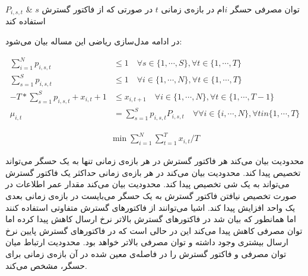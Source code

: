 $P_{i, s, t}$ & توان مصرفی حسگر $i$ام در بازه‌ی زمانی $t$ در صورتی که از فاکتور گسترش $s$ استفاده کند \\



در ادامه مدل‌سازی ریاضی این مساله بیان می‌شود:

\begin{align}
  \sum_{i = 1}^{N} p_{i, s, t} &\le 1 \quad \forall s \in \{1, \cdots, S\}, \forall t \in \{1, \cdots, T\} \label{eq:constr_subchannel_limit} \\
  \sum_{s = 1}^{S} p_{i, s, t} &\le 1 \quad \forall i \in \{1, \cdots, N\}, \forall t \in \{1, \cdots, T\} \label{eq:constr_thing_limit} \\
  -T * \sum_{s = 1}^{S} p_{i, s, t} + x_{i, t} + 1 &\le x_{i, t + 1} \quad \forall i \in \{1, \cdots, N\}, \forall t \in \{1, \cdots, T - 1\} \label{eq:constr_aoi_limit} \\
  \mu_{i, t} &= \sum_{s = 1}^{S} p_{i, s, t} P_{i, s, t}  \quad \forall \forall i \in \{i, \cdots, N\}, \forall t in \{1, \cdots, T\} \label{eq:constr_power_range}
\end{align}

\begin{align}
  \min \sum_{i = 1}^{N} \sum_{t = 1}^{T} x_{i, t} / T
\end{align}


محدودیت  بیان می‌کند هر فاکتور گسترش در هر بازه‌ی زمانی تنها به یک حسگر می‌تواند تخصیص پیدا کند.
محدودیت  بیان می‌کند در هر بازه‌ی زمانی حداکثر یک فاکتور گسترش می‌تواند به یک شی تخصیص پیدا کند.
محدودیت  بیان می‌کند مقدار عمر اطلاعات در صورت تخصیص نیافتن فاکتور گسترش به یک حسگر می‌بایست در بازه‌ی زمانی بعدی یک واحد افزایش پیدا کند.
اشیا می‌توانند از فاکتورهای گسترش متفاوتی استفاده کنند اما همانطور که بیان شد در فاکتورهای گسترش بالاتر نرخ ارسال کاهش پیدا کرده اما توان مصرفی کاهش پیدا می‌کند این در حالی است که
در فاکتورهای گسترش پایین نرخ ارسال بیشتری وجود داشته و توان مصرفی بالاتر خواهد بود. محدودیت  ارتباط میان توان مصرفی و فاکتور گسترش را در فاصله‌ی
معین شده در آن بازه‌ی زمانی برای حسگر، مشخص می‌کند.
